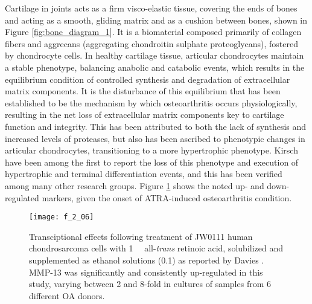 \begin{refsection}
Cartilage in joints acts as a firm visco-elastic tissue, covering the ends of
bones and acting as a smooth, gliding matrix and as a cushion between bones,
shown in Figure \ref{fig:bone_diagram_1}. It is a biomaterial composed primarily
of collagen fibers and aggrecans (aggregating chondroitin sulphate
proteoglycans), fostered by chondrocyte cells. In healthy cartilage tissue,
articular chondrocytes maintain a stable phenotype, balancing anabolic and
catabolic events, which results in the equilibrium condition of controlled
synthesis and degradation of extracellular matrix components.\cite{Sandell2001}
It is the disturbance of this equilibrium that has been established to be the
mechanism by which osteoarthritis occurs physiologically, resulting in the net
loss of extracellular matrix components key to cartilage function and integrity.
This has been attributed to both the lack of synthesis and increased levels of
proteases, but also has been ascribed to phenotypic changes in articular
chondrocytes, transitioning to a more hypertrophic
phenotype.\cite{Goldring2000,VanderKraan2012} Kirsch  have
been among the first to report the loss of this phenotype and execution of
hypertrophic and terminal differentiation events,\cite{Kirsch2000} and this has
been verified among many other research
groups.\cite{Tchetina2007,Merz2003,Pfander2001,Davies2009} Figure
\ref{fig:OA_phenotype} shows the noted up- and down-regulated markers, given the
onset of ATRA-induced osteoarthritis condition.

\begin{figure}[h!] \centering \texttt{[image: f\_2\_06]}
    \caption[Transciptional effects following treatment of JW0111 human
        chondrosarcoma cells with \SI{1}{\micro\moLar} all-\emph{trans} retinoic
        acid, solubilized and supplemented as ethanol solutions
        (\SI{0.1}{\volper}) as reported by Davies . MMP-13 was
    significantly and consistently up-regulated in this study, varying between 2
and 8-fold in cultures of samples from 6 different OA donors.  ]{Transciptional
    effects following treatment of JW0111 human chondrosarcoma cells with
    \SI{1}{\micro\moLar} all-\emph{trans} retinoic acid, solubilized and
    supplemented as ethanol solutions (\SI{0.1}{\volper}) as reported by Davies
    . MMP-13 was significantly and consistently up-regulated in
    this study, varying between 2 and 8-fold in cultures of samples from 6
    different OA donors.\cite{Davies2009}}
    \label{fig:OA_phenotype} \end{figure}


\end{refsection}
